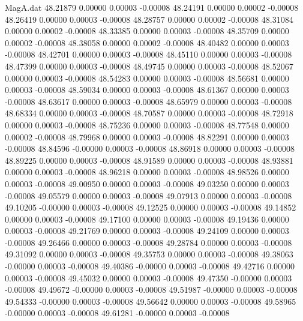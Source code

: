 \begin{filecontents}{MagA.dat}
  48.21879    0.00000    0.00003   -0.00008
  48.24191    0.00000    0.00002   -0.00008
  48.26419    0.00000    0.00003   -0.00008
  48.28757    0.00000    0.00002   -0.00008
  48.31084    0.00000    0.00002   -0.00008
  48.33385    0.00000    0.00003   -0.00008
  48.35709    0.00000    0.00002   -0.00008
  48.38058    0.00000    0.00002   -0.00008
  48.40482    0.00000    0.00003   -0.00008
  48.42701    0.00000    0.00003   -0.00008
  48.45110    0.00000    0.00003   -0.00008
  48.47399    0.00000    0.00003   -0.00008
  48.49745    0.00000    0.00003   -0.00008
  48.52067    0.00000    0.00003   -0.00008
  48.54283    0.00000    0.00003   -0.00008
  48.56681    0.00000    0.00003   -0.00008
  48.59034    0.00000    0.00003   -0.00008
  48.61367    0.00000    0.00003   -0.00008
  48.63617    0.00000    0.00003   -0.00008
  48.65979    0.00000    0.00003   -0.00008
  48.68334    0.00000    0.00003   -0.00008
  48.70587    0.00000    0.00003   -0.00008
  48.72918    0.00000    0.00003   -0.00008
  48.75236    0.00000    0.00003   -0.00008
  48.77548    0.00000    0.00002   -0.00008
  48.79968    0.00000    0.00003   -0.00008
  48.82291    0.00000    0.00003   -0.00008
  48.84596   -0.00000    0.00003   -0.00008
  48.86918    0.00000    0.00003   -0.00008
  48.89225    0.00000    0.00003   -0.00008
  48.91589    0.00000    0.00003   -0.00008
  48.93881    0.00000    0.00003   -0.00008
  48.96218    0.00000    0.00003   -0.00008
  48.98526    0.00000    0.00003   -0.00008
  49.00950    0.00000    0.00003   -0.00008
  49.03250    0.00000    0.00003   -0.00008
  49.05579    0.00000    0.00003   -0.00008
  49.07913    0.00000    0.00003   -0.00008
  49.10205   -0.00000    0.00003   -0.00008
  49.12525    0.00000    0.00003   -0.00008
  49.14852    0.00000    0.00003   -0.00008
  49.17100    0.00000    0.00003   -0.00008
  49.19436    0.00000    0.00003   -0.00008
  49.21769    0.00000    0.00003   -0.00008
  49.24109    0.00000    0.00003   -0.00008
  49.26466    0.00000    0.00003   -0.00008
  49.28784    0.00000    0.00003   -0.00008
  49.31092    0.00000    0.00003   -0.00008
  49.35753    0.00000    0.00003   -0.00008
  49.38063   -0.00000    0.00003   -0.00008
  49.40386   -0.00000    0.00003   -0.00008
  49.42716    0.00000    0.00003   -0.00008
  49.45032    0.00000    0.00003   -0.00008
  49.47350   -0.00000    0.00003   -0.00008
  49.49672   -0.00000    0.00003   -0.00008
  49.51987   -0.00000    0.00003   -0.00008
  49.54333   -0.00000    0.00003   -0.00008
  49.56642    0.00000    0.00003   -0.00008
  49.58965   -0.00000    0.00003   -0.00008
  49.61281   -0.00000    0.00003   -0.00008

\end{filecontents}
